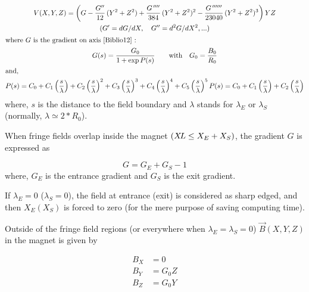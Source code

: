 \begin{gather*}
 	V(X,Y,Z)     =   \left(G- \dfrac{G^{\prime\prime} }{ 12}\, (Y^2+Z^2)+
	             \dfrac{G^{\quaprime} }{ 384}\, (Y^2+Z^2)^2-
	             \dfrac{G^{\cinqprime\prime} }{ 23040}\, (Y^2+Z^2)^3 \right)YZ  \\
	(G^\prime     =    dG/dX,\quad G^{\prime\prime} =d^2G/dX^2,...) \\
\intertext{where $ G $ is the gradient on axis~\protect\cite{Biblio12}~:  } %
    G(s) = \dfrac{G_0 }{ 1+ \exp  P(s)}\qquad \text{with} \quad G_0=\dfrac{B_0}{R_0} \\
\intertext{and,}
     P(s) = C_0
       +C_1 \left(  \dfrac{s }{ \lambda} \right) 
       +C_2 \left( \dfrac{s }{ \lambda} \right)^2 
       + C_3 \left( \dfrac{s }{ \lambda} \right)^3 
       +C_4 \left( \dfrac{s }{ \lambda} \right)^4 
       + C_5 \left(\dfrac{s }{ \lambda} \right)^5
       P(s)=C_0+C_1 \left(\dfrac{s }{ \lambda} \right) + C_2 \left(\dfrac{s }{ \lambda}\right)
\end{gather*}
%
 where, $ s $ is the distance to the field boundary and $\lambda$
stands for $ \lambda_ E $ or $ \lambda_ S $ 
(normally, $ \lambda  \simeq  2  \ast  R_0$). 

\noindent When fringe fields overlap inside the magnet $ (X\!L\leq X_E+X_S)$,  
the gradient $ G $ is expressed as 

$$ G = G_E+G_S-1 $$
%
where, $ G_E $ is the entrance gradient and $ G_S $ is the exit gradient. 

\noindent If $ \lambda_ E=0$ ($\lambda_ S=0$),  the field at entrance 
(exit) is considered as sharp edged, and then $ X_E(X_S) $ is forced to zero 
(for the mere purpose of saving computing time). 

\noindent Outside of the fringe field regions (or everywhere when 
$ \lambda_E=\lambda_ S=0$)   $ \vec  B(X,Y,Z) $ in the magnet is given by 

\begin{align*}
	B_X &   =     0 \\
	B_Y &   =    G_0Z \\
	B_Z &   =     G_0Y  
\end{align*}

\newpage

